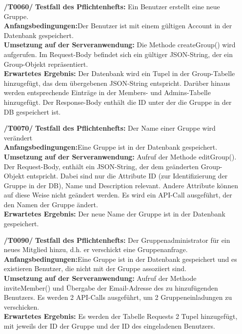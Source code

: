 \documentclass[11pt,a4paper]{scrartcl}
\begin{document}
\begin{enumerate}
	\item[\textbf{/T0060/}]
	\textbf{Testfall des Pflichtenhefts: }Ein Benutzer erstellt eine neue Gruppe.\\
	\textbf{Anfangsbedingungen:}Der Benutzer ist mit einem gültigen Account in der Datenbank gespeichert.\\
	\textbf{Umsetzung auf der Serveranwendung: }Die Methode createGroup() wird aufgerufen. Im Request-Body befindet sich ein gültiger JSON-String, der ein Group-Objekt repräsentiert.\\
	\textbf{Erwartetes Ergebnis: }Der Datenbank wird ein Tupel in der Group-Tabelle hinzugefügt, das dem übergebenen JSON-String entspricht. Darüber hinaus werden entsprechende Einträge in der Members- und Admins-Tabelle hinzugefügt. Der Response-Body enthält die ID unter der die Gruppe in der DB gespeichert ist.
	
	\item[\textbf{/T0070/}]
	\textbf{Testfall des Pflichtenhefts: }Der Name einer Gruppe wird verändert\\
	\textbf{Anfangsbedingungen:}Eine Gruppe ist in der Datenbank gespeichert.\\
	\textbf{Umsetzung auf der Serveranwendung: }Aufruf der Methode editGroup(). Der Request-Body, enthält ein JSON-String, der dem geänderten Group-Objekt entspricht. Dabei sind nur die Attribute ID (zur Identifizierung der Gruppe in der DB), Name und Description relevant. Andere Attribute können auf diese Weise nicht geändert werden. Es wird ein API-Call ausgeführt, der den Namen der Gruppe ändert.\\
	\textbf{Erwartetes Ergebnis: }Der neue Name der Gruppe ist in der Datenbank gespeichert.
	
	\item[\textbf{/T0090/}]
	\textbf{Testfall des Pflichtenhefts: }Der Gruppenadministrator für ein neues Mitglied hinzu, d.h. er verschickt eine Gruppenanfrage.\\
	\textbf{Anfangsbedingungen:}Eine Gruppe ist in der Datenbank gespeichert und es existieren Benutzer, die nicht mit der Gruppe assoziiert sind.\\
	\textbf{Umsetzung auf der Serveranwendung: }Aufruf der Methode inviteMember() und Übergabe der Email-Adresse des zu hinzufügenden Benutzers. Es werden 2 API-Calls ausgeführt, um 2 Gruppeneinladungen zu verschicken.\\
	\textbf{Erwartetes Ergebnis: }Es werden der Tabelle Requests 2 Tupel hinzugefügt, mit jeweils der ID der Gruppe und der ID des eingeladenen Benutzers.
	

\end{enumerate}
\end{document}
